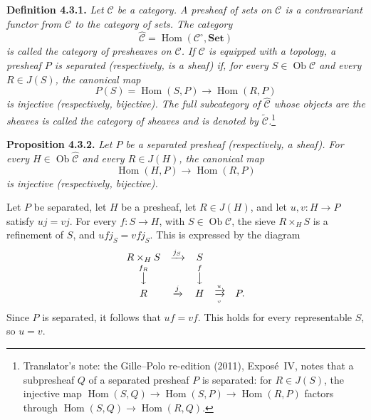 \medskip
\noindent{}\textbf{Definition 4.3.1.}
\textit{Let \(\mathscr C\) be a category. A \emph{presheaf of sets} on
\(\mathscr C\) is a contravariant functor from \(\mathscr C\) to the
category of sets. The category}
\[
 \widehat{\mathscr C}
 =\operatorname{Hom}(\mathscr C^{\circ},\mathbf{Set})
\]
\textit{is called the \emph{category of presheaves} on \(\mathscr C\). If
\(\mathscr C\) is equipped with a topology, a presheaf \(P\) is
\emph{separated} (respectively, is a \emph{sheaf}) if, for every
\(S\in\operatorname{Ob}\mathscr C\) and every \(R\in J(S)\), the canonical
map}
\[
\tag{+}\label{sga3:iv:definition:4:3:1:eq:unnamed:01}
 P(S)=\operatorname{Hom}(S,P)\longrightarrow\operatorname{Hom}(R,P)
\]
\textit{is injective (respectively, bijective). The full subcategory of
\(\widehat{\mathscr C}\) whose objects are the sheaves is called the
\emph{category of sheaves} and is denoted by
\(\widetilde{\mathscr C}\).}\footnote{Translator's note: the Gille--Polo re-edition (2011), Expos\'e~IV, notes
that a subpresheaf \(Q\) of a separated presheaf \(P\) is separated: for
\(R\in J(S)\), the injective map
\(\operatorname{Hom}(S,Q)\to\operatorname{Hom}(S,P)\to\operatorname{Hom}(R,P)\)
factors through \(\operatorname{Hom}(S,Q)\to\operatorname{Hom}(R,Q)\).}

\medskip
\noindent{}\textbf{Proposition 4.3.2.}
\textit{Let \(P\) be a separated presheaf (respectively, a sheaf). For
every \(H\in\operatorname{Ob}\widehat{\mathscr C}\) and every
\(R\in J(H)\), the canonical map}
\[
\tag{+}\label{sga3:iv:proposition:4:3:2:eq:unnamed:01}
 \operatorname{Hom}(H,P)\longrightarrow\operatorname{Hom}(R,P)
\]
\textit{is injective (respectively, bijective).}

Let \(P\) be separated, let \(H\) be a presheaf, let \(R\in J(H)\), and
let \(u,v:H\to P\) satisfy \(uj=vj\). For every \(f:S\to H\), with
\(S\in\operatorname{Ob}\mathscr C\), the sieve \(R\times_HS\) is a
refinement of \(S\), and \(ufj_S=vfj_S\). This is expressed by the diagram
\[
\begin{array}{ccccc}
 R\times_HS&\xrightarrow{j_S}&S&&\\
 \overset{f_R}{\big\downarrow}&&
 \overset{f}{\big\downarrow}&&\\
 R&\xrightarrow{j}&H&
 \mathrel{\substack{\xrightarrow{u}\\[-0.5ex]\xrightarrow[v]{}}}&P.
\end{array}
\]
Since \(P\) is separated, it follows that \(uf=vf\). This holds for every
representable \(S\), so \(u=v\).

